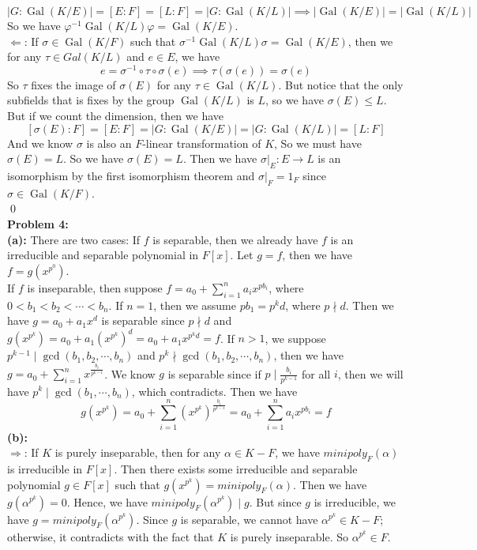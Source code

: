 \documentclass[12pt]{amsart}
\newcommand{\Gal}[0]{\operatorname{Gal}}
\begin{document}
\[|G:\Gal(K/E)|=[E:F]=[L:F]=|G:\Gal(K/L)|\implies |\Gal(K/E)|=|\Gal(K/L)|\]
So we have $\varphi^{-1}\Gal(K/L)\varphi=\Gal(K/E)$.\\
$\Longleftarrow $: If $\sigma\in \Gal(K/F)$ such that $\sigma^{-1}\Gal(K/L)\sigma=\Gal(K/E)$, then we for any $\tau\in Gal(K/L)$ and $e\in E$, we have 
\[e=\sigma^{-1}\circ \tau\circ \sigma(e)\implies \tau(\sigma(e))=\sigma(e)\]
So $\tau$ fixes the image of $\sigma(E)$ for any $\tau\in \Gal(K/L)$. But notice that the only subfields that is fixes by the group $\Gal(K/L)$ is $L$, so we have $\sigma(E)\leq L$. But if we count the dimension, then we have 
\[[\sigma(E):F]=[E:F]=|G:\Gal(K/E)|=|G:\Gal(K/L)|=[L:F]\]
And we know $\sigma$ is also an $F$-linear transformation of $K$, So we must have $\sigma(E)=L$. So we have $\sigma(E)=L$. Then we have $\sigma|_E:E\to L$ is an isomorphism by the first isomorphism theorem and $\sigma|_F=1_F$ since $\sigma\in \Gal(K/F)$.
\\\qed\\
\textbf{Problem 4:}\\
\textbf{(a): }There are two cases: If $f$ is separable, then we already have $f$ is an irreducible and separable polynomial in $F[x]$. Let $g=f$, then we have $f=g(x^{p^0})$.\\
If $f$ is inseparable, then suppose $f=a_0+\sum_{i=1}^na_ix^{pb_i}$, where $0<b_1<b_2<\cdots<b_n$. If $n=1$, then we assume $pb_1=p^kd$, where $p\nmid d$. Then we have $g=a_0+a_1x^d$ is separable since $p\nmid d$ and $g(x^{p^k})=a_0+a_1(x^{p^k})^d=a_0+a_1x^{p^kd}=f$. If $n>1$, we suppose $p^{k-1}\mid \gcd(b_1,b_2,\cdots, b_n)$ and $p^k\nmid \gcd(b_1,b_2,\cdots, b_n)$, then we have $g=a_0+\sum_{i=1}^nx^{\frac{b_i}{p^{k-1}}}$. We know $g$ is separable since if $p\mid \frac{b_i}{p^{k-1}}$ for all $i$, then we will have $p^k\mid \gcd(b_1,\cdots,b_n)$, which contradicts. Then we have 
\[g(x^{p^k})=a_0+\sum_{i=1}^n(x^{p^k})^{\frac{b_i}{p^{k-1}}}=a_0+\sum_{i=1}^na_ix^{pb_i}=f\]
\textbf{(b): }\\
$\Longrightarrow$: If $K$ is purely inseparable, then for any $\alpha\in K-F$, we have $minipoly_F(\alpha)$ is irreducible in $F[x]$. Then there exists some irreducible and separable polynomial $g\in F[x]$ such that $g(x^{p^k})=minipoly_F(\alpha)$. Then we have $g(\alpha^{p^k})=0$. Hence, we have $minipoly_F(\alpha^{p^k})\mid g$. But since $g$ is irreducible, we have $g=minipoly_F(\alpha^{p^k})$. Since $g$ is separable, we cannot have $\alpha^{p^k}\in K-F$; otherwise, it contradicts with the fact that $K$ is purely inseparable. So $\alpha^{p^k}\in F$.  \\
\end{document}
